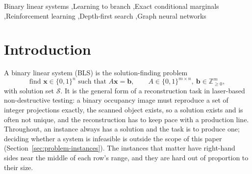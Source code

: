 \documentclass[final,5p,times,twocolumn,authoryear]{elsarticle}
\newcommand{\SOL}{\mathcal{S}}
\begin{document}
\begin{frontmatter}
\begin{abstract}
$28\times$ worse. Plugged into SCIP as a branching rule the policy expands $1.9$--$3.8\times$ fewer nodes than reliability pseudocost branching with conflict analysis on or off and matches its time at the two larger sizes, while a complete solver with presolve and clause learning remains faster end to end; the gap is per-node cost, not tree size.
\end{abstract}

\begin{keyword}
Binary linear systems \sep Learning to branch \sep Exact conditional marginals \sep Reinforcement learning \sep Depth-first search \sep Graph neural networks
\end{keyword}

\end{frontmatter}

\section{Introduction}
\label{sec:intro}

A binary linear system (BLS) is the solution-finding problem
\begin{equation}
\text{find } \mathbf{x}\in\{0,1\}^n \text{ such that } A\mathbf{x}=\mathbf{b},\qquad A\in\{0,1\}^{m\times n},\ \mathbf{b}\in\mathbb{Z}_{\ge0}^m,
\label{eq:bls}
\end{equation}
with solution set $\SOL$. It is the general form of a reconstruction task in laser-based non-destructive testing: a binary occupancy image must reproduce a set of integer projections exactly, the scanned object exists, so a solution exists and is often not unique, and the reconstruction has to keep pace with a production line. Throughout, an instance always has a solution and the task is to produce one; deciding whether a system is infeasible is outside the scope of this paper (Section~\ref{sec:problem-instances}). The instances that matter have right-hand sides near the middle of each row's range, and they are hard out of proportion to their size.
\end{document}
